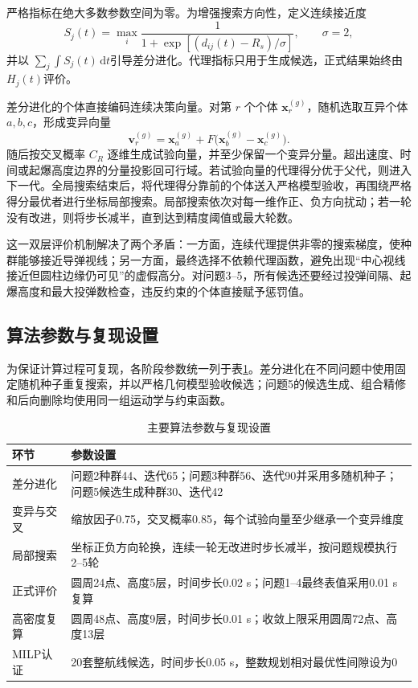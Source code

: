 \documentclass[12pt,a4paper]{ctexart}
\begin{document}
严格指标在绝大多数参数空间为零。为增强搜索方向性，定义连续接近度
\begin{equation}
S_j(t)=\max_i
\frac{1}{1+\exp[(d_{ij}(t)-R_s)/\sigma]},\qquad \sigma=2,
\end{equation}
并以 $\sum_j\int S_j(t)\,\mathrm dt$引导差分进化。代理指标只用于生成候选，正式结果始终由 $H_j(t)$评价。

差分进化的个体直接编码连续决策向量。对第 $r$ 个个体 $\bm x_r^{(g)}$，随机选取互异个体 $a,b,c$，形成变异向量
\begin{equation}
\bm v_r^{(g)}=\bm x_a^{(g)}+F\bigl(\bm x_b^{(g)}-\bm x_c^{(g)}\bigr).
\end{equation}
随后按交叉概率 $C_R$ 逐维生成试验向量，并至少保留一个变异分量。超出速度、时间或起爆高度边界的分量投影回可行域。若试验向量的代理得分优于父代，则进入下一代。全局搜索结束后，将代理得分靠前的个体送入严格模型验收，再围绕严格得分最优者进行坐标局部搜索。局部搜索依次对每一维作正、负方向扰动；若一轮没有改进，则将步长减半，直到达到精度阈值或最大轮数。

这一双层评价机制解决了两个矛盾：一方面，连续代理提供非零的搜索梯度，使种群能够接近导弹视线；另一方面，最终选择不依赖代理函数，避免出现“中心视线接近但圆柱边缘仍可见”的虚假高分。对问题3--5，所有候选还要经过投弹间隔、起爆高度和最大投弹数检查，违反约束的个体直接赋予惩罚值。

\subsection{算法参数与复现设置}

为保证计算过程可复现，各阶段参数统一列于表\ref{tab:param}。差分进化在不同问题中使用固定随机种子重复搜索，并以严格几何模型验收候选；问题5的候选生成、组合精修和后向删除均使用同一组运动学与约束函数。

\begin{table}[H]
\centering
\caption{主要算法参数与复现设置}
\label{tab:param}
\begin{tabularx}{0.94\textwidth}{lX}
\toprule
环节 & 参数设置\\
\midrule
差分进化 & 问题2种群44、迭代65；问题3种群56、迭代90并采用多随机种子；问题5候选生成种群30、迭代42\\
变异与交叉 & 缩放因子0.75，交叉概率0.85，每个试验向量至少继承一个变异维度\\
局部搜索 & 坐标正负方向轮换，连续一轮无改进时步长减半，按问题规模执行2--5轮\\
正式评价 & 圆周24点、高度5层，时间步长0.02 s；问题1--4最终表值采用0.01 s复算\\
高密度复算 & 圆周48点、高度9层，时间步长0.01 s；收敛上限采用圆周72点、高度13层\\
MILP认证 & 20套整航线候选，时间步长0.05 s，整数规划相对最优性间隙设为0\\
\bottomrule
\end{tabularx}
\end{table}
\end{document}
